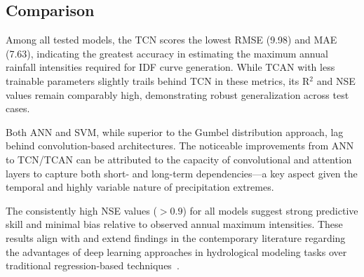 \subsection{Comparison}
Among all tested models, the TCN scores the lowest RMSE (9.98) and MAE (7.63), indicating the greatest accuracy in estimating the maximum annual rainfall intensities required for IDF curve generation. While TCAN with less trainable parameters slightly trails behind TCN in these metrics, its R$^{2}$ and NSE values remain comparably high, demonstrating robust generalization across test cases.

\vspace{1em}

Both ANN and SVM, while superior to the Gumbel distribution approach, lag behind convolution-based architectures. The noticeable improvements from ANN to TCN/TCAN can be attributed to the capacity of convolutional and attention layers to capture both short- and long-term dependencies—a key aspect given the temporal and highly variable nature of precipitation extremes.

\vspace{1em}

The consistently high NSE values ($> 0.9$) for all models suggest strong predictive skill and minimal bias relative to observed annual maximum intensities. These results align with and extend findings in the contemporary literature regarding the advantages of deep learning approaches in hydrological modeling tasks over traditional regression-based techniques~\cite{19}.